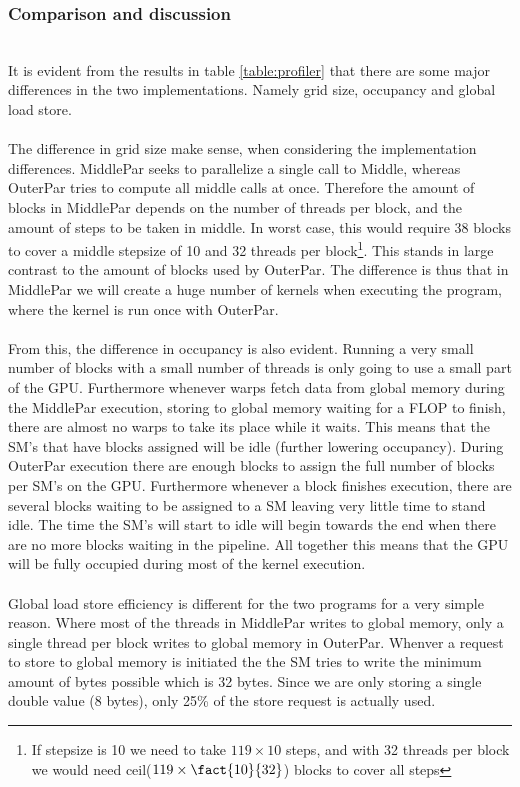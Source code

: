 \subsubsection{Comparison and discussion} \hfill \\
It is evident from the results in table \ref{table:profiler} that there are some major differences in the two implementations. Namely grid size, occupancy and global load store.
\\ \\
The difference in grid size make sense, when considering the implementation differences. MiddlePar seeks to parallelize a single call to Middle, whereas OuterPar tries to compute all middle calls at once. Therefore the amount of blocks in MiddlePar depends on the number of threads per block, and the amount of steps to be taken in middle. In worst case, this would require 38 blocks to cover a middle stepsize of 10 and 32 threads per block\footnote{If stepsize is 10 we need to take $119 \times 10$ steps, and with 32 threads per block we would need ceil($119 \times \fact{10}{32}$) blocks to cover all steps}. This stands in large contrast to the amount of blocks used by OuterPar. The difference is thus that in MiddlePar we will create a huge number of kernels when executing the program, where the kernel is run once with OuterPar.
\\ \\
From this, the difference in occupancy is also evident. Running a very small number of blocks with a small number of threads is only going to use a small part of the GPU. Furthermore whenever warps fetch data from global memory during the MiddlePar execution, storing to global memory waiting for a FLOP to finish, there are almost no warps to take its place while it waits. This means that the SM's that have blocks assigned will be idle (further lowering occupancy). During OuterPar execution there are enough blocks to assign the full number of blocks per SM's on the GPU. Furthermore whenever a block finishes execution, there are several blocks waiting to be assigned to a SM leaving very little time to stand idle. The time the SM's will start to idle will begin towards the end when there are no more blocks waiting in the pipeline. All together this means that the GPU will be fully occupied during most of the kernel execution.
\\ \\
Global load store efficiency is different for the two programs for a very simple reason. Where most of the threads in MiddlePar writes to global memory, only a single thread per block writes to global memory in OuterPar. Whenver a request to store to global memory is initiated the the SM tries to write the minimum amount of bytes possible which is 32 bytes. Since we are only storing a single double value (8 bytes), only 25\% of the store request is actually used.